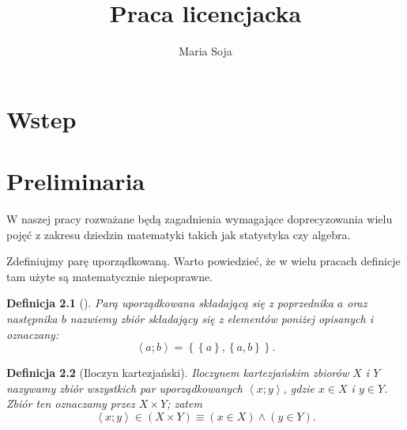 \documentclass[12pt,a4paper]{report}
\author{Maria Soja}
\title{Praca licencjacka}
\newtheorem{definition}{Definicja}
\newcommand{\parauporzadkowana}[2]{\left\langle {#1}; {#2} \right\rangle}
\newcommand{\zbior}[1]{\left\lbrace {#1} \right\rbrace }
\begin{document}
\maketitle

\chapter{Wstep}

\chapter{Preliminaria}

%

W naszej pracy rozważane będą zagadnienia wymagające doprecyzowania wielu pojęć z zakresu dziedzin matematyki takich jak statystyka czy algebra. 


Zdefiniujmy parę uporządkowaną. Warto powiedzieć, że w wielu pracach definicje tam użyte są matematycznie niepoprawne.

\begin{definition}[\citep{kuratowski1966wstkep}]
Parą uporządkowana składającą się z poprzednika $a$ oraz następnika $b$ nazwiemy zbiór składający się z elementów poniżej opisanych i oznaczany:
\begin{equation*}
\parauporzadkowana{a}{b}=\zbior{\zbior{a}, \zbior{a,b}}.
\end{equation*}

\end{definition}

\begin{definition}[Iloczyn kartezjański\citep{kuratowski1966wstkep}]
Iloczynem kartezjańskim zbiorów $X$ i $Y$ nazywamy zbiór wszystkich par uporządkowanych $\parauporzadkowana{x}{y}$, gdzie $x \in X$ i $y \in Y$. Zbiór ten oznaczamy przez $ X \times Y$; zatem
\begin{equation*}
\parauporzadkowana{x}{y} \in (X \times Y) \equiv (x \in X) \land (y \in Y).
\end{equation*} 

\end{definition}
\end{document}
